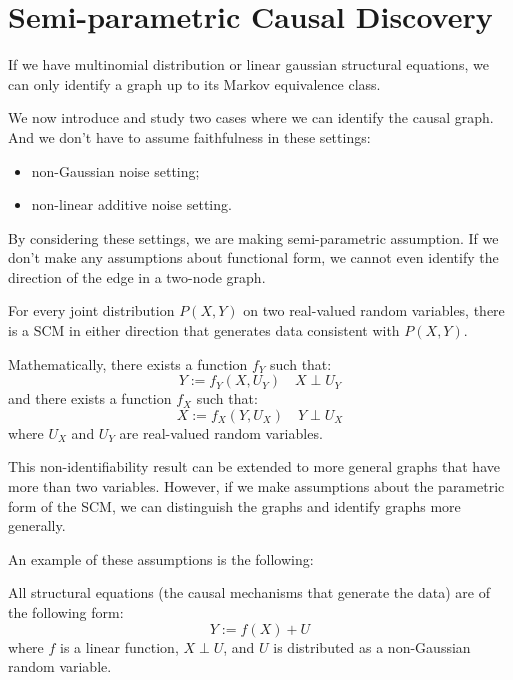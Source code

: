 \section{Semi-parametric Causal Discovery}
\begin{definition}
    If we have multinomial distribution or linear gaussian structural equations,
    we can only identify a graph up to its Markov equivalence class.
\end{definition}

We now introduce and study two cases where we can identify the causal graph. And
we don't have to assume faithfulness in these settings:
\begin{itemize}
    \item non-Gaussian noise setting;
    \item non-linear additive noise setting.
\end{itemize}
By considering these settings, we are making semi-parametric assumption. If we
don't make any assumptions about functional form, we cannot even identify the
direction of the edge in a two-node graph.
\begin{definition}
    For every joint distribution $P(X, Y)$ on two real-valued random variables,
    there is a SCM in either direction that generates data consistent with $P(X, Y)$.

    Mathematically, there exists a function $f_Y$ such that:
    \begin{equation*}
        Y := f_Y(X, U_Y) \quad X \perp U_Y
    \end{equation*}
    and there exists a function $f_X$ such that:
    \begin{equation*}
        X := f_X(Y, U_X) \quad Y \perp U_X
    \end{equation*}
    where $U_X$ and $U_Y$ are real-valued random variables.
\end{definition}
This non-identifiability result can be extended to more general graphs that have
more than two variables. However, if we make assumptions about the parametric form
of the SCM, we can distinguish the graphs and identify graphs more generally.

An example of these assumptions is the following:
\begin{definition}
    All structural equations (the causal mechanisms that generate the data) are
    of the following form:
    \begin{equation}
        Y := f(X) + U
    \end{equation}
    where $f$ is a linear function, $X \perp U$, and $U$ is distributed as a non-Gaussian
    random variable.
\end{definition}

